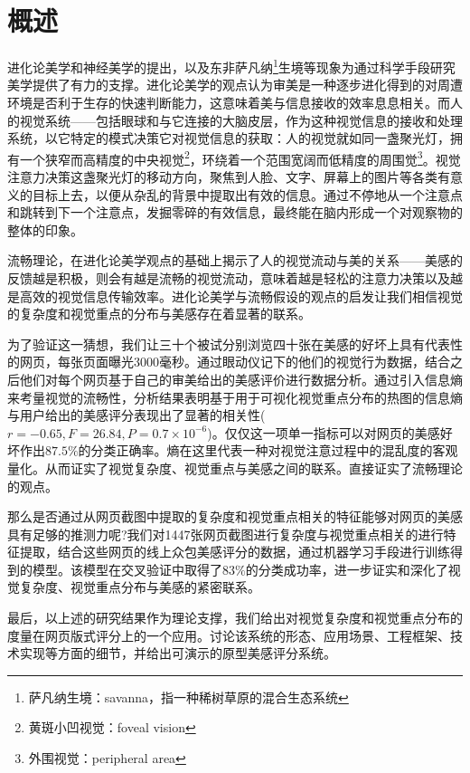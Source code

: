 
\chapter{概述}
\label{chap:introduction}
进化论美学和神经美学的提出，以及东非萨凡纳\footnote{萨凡纳生境：savanna，指一种稀树草原的混合生态系统}生境等现象为通过科学手段研究美学提供了有力的支撑。进化论美学的观点认为审美是一种逐步进化得到的对周遭环境是否利于生存的快速判断能力，这意味着美与信息接收的效率息息相关。而人的视觉系统——包括眼球和与它连接的大脑皮层，作为这种视觉信息的接收和处理系统，以它特定的模式决策它对视觉信息的获取：人的视觉就如同一盏聚光灯，拥有一个狭窄而高精度的中央视觉\footnote{黄斑小凹视觉：foveal vision}，环绕着一个范围宽阔而低精度的周围觉\footnote{外围视觉：peripheral area}。视觉注意力决策这盏聚光灯的移动方向，聚焦到人脸、文字、屏幕上的图片等各类有意义的目标上去，以便从杂乱的背景中提取出有效的信息。通过不停地从一个注意点和跳转到下一个注意点，发掘零碎的有效信息，最终能在脑内形成一个对观察物的整体的印象。

流畅理论，在进化论美学观点的基础上揭示了人的视觉流动与美的关系——美感的反馈越是积极，则会有越是流畅的视觉流动，意味着越是轻松的注意力决策以及越是高效的视觉信息传输效率。进化论美学与流畅假设的观点的启发让我们相信视觉的复杂度和视觉重点的分布与美感存在着显著的联系。

为了验证这一猜想，我们让三十个被试分别浏览四十张在美感的好坏上具有代表性的网页，每张页面曝光3000毫秒。通过眼动仪记下的他们的视觉行为数据，结合之后他们对每个网页基于自己的审美给出的美感评价进行数据分析。通过引入信息熵来考量视觉的流畅性，分析结果表明基于用于可视化视觉重点分布的热图的信息熵与用户给出的美感评分表现出了显著的相关性($r=-0.65, F=26.84, P=0.7\times 10^{-6}$)。仅仅这一项单一指标可以对网页的美感好坏作出$87.5\%$的分类正确率。熵在这里代表一种对视觉注意过程中的混乱度的客观量化。从而证实了视觉复杂度、视觉重点与美感之间的联系。直接证实了流畅理论的观点。

那么是否通过从网页截图中提取的复杂度和视觉重点相关的特征能够对网页的美感具有足够的推测力呢?我们对1447张网页截图进行复杂度与视觉重点相关的进行特征提取，结合这些网页的线上众包美感评分的数据，通过机器学习手段进行训练得到的模型。该模型在交叉验证中取得了$83\%$的分类成功率，进一步证实和深化了视觉复杂度、视觉重点分布与美感的紧密联系。

最后，以上述的研究结果作为理论支撑，我们给出对视觉复杂度和视觉重点分布的度量在网页版式评分上的一个应用。讨论该系统的形态、应用场景、工程框架、技术实现等方面的细节，并给出可演示的原型美感评分系统。
